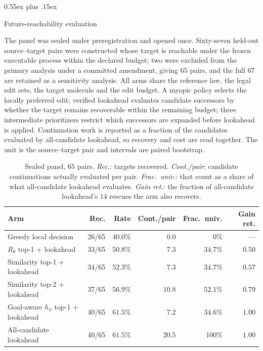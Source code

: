 \documentclass{article}
\makeatletter
\theoremstyle{definition}
\theoremstyle{remark}
\def\subsection{\@startsection{subsection}{2}{\z@}{-1.2ex plus -0.4ex minus -.2ex}%
  {0.55ex plus .15ex}{\normalsize\sc\raggedright}}
\makeatother
\begin{document}
\subsection{Future-reachability evaluation}
\label{app:exp-lookahead}

The panel was sealed under preregistration and opened once. Sixty-seven held-out source--target pairs were constructed whose target is reachable under the frozen executable process within the declared budget; two were excluded from the primary analysis under a committed amendment, giving $65$ pairs, and the full $67$ are retained as a sensitivity analysis. All arms share the reference law, the legal edit sets, the target molecule and the edit budget. A myopic policy selects the locally preferred edit; verified lookahead evaluates candidate successors by whether the target remains recoverable within the remaining budget; three intermediate prioritizers restrict which successors are expanded before lookahead is applied. Continuation work is reported as a fraction of the candidates evaluated by all-candidate lookahead, so recovery and cost are read together. The unit is the source--target pair and intervals are paired bootstrap.

\begin{table}[h]
\centering
{\small\setlength{\tabcolsep}{4pt}
\begin{tabular}{lrrrrr}
\toprule
Arm & Rec. & Rate & Cont./pair & Frac.\ univ. & Gain ret. \\
\midrule
Greedy local decision            & 26/65 & $40.0\%$ & $0.0$  & $0\%$    & --- \\
$R_\theta$ top-1 + lookahead     & 33/65 & $50.8\%$ & $7.3$  & $34.7\%$ & $0.50$ \\
Similarity top-1 + lookahead     & 34/65 & $52.3\%$ & $7.3$  & $34.7\%$ & $0.57$ \\
Similarity top-2 + lookahead     & 37/65 & $56.9\%$ & $10.8$ & $52.1\%$ & $0.79$ \\
Goal-aware $h_\phi$ top-1 + lookahead & 40/65 & $61.5\%$ & $7.2$ & $34.6\%$ & $1.00$ \\
All-candidate lookahead          & 40/65 & $61.5\%$ & $20.5$ & $100\%$  & $1.00$ \\
\bottomrule
\end{tabular}}
\caption{\small Sealed panel, $65$ pairs. \emph{Rec.}: targets recovered. \emph{Cont./pair}: candidate continuations actually evaluated per pair. \emph{Frac.\ univ.}: that count as a share of what all-candidate lookahead evaluates. \emph{Gain ret.}: the fraction of all-candidate lookahead's $14$ rescues the arm also recovers.}
\label{tab:lookahead-full}
\end{table}
\end{document}
